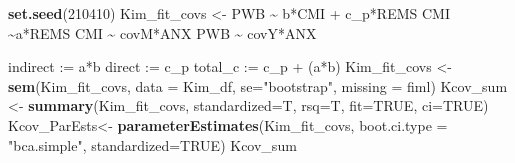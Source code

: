 \documentclass[
  11pt,
]{book}
\newenvironment{Shaded}{\begin{snugshade}}{\end{snugshade}}
\newcommand{\AttributeTok}[1]{\textcolor[rgb]{0.27,0.27,0.27}{#1}}
\newcommand{\ConstantTok}[1]{\textcolor[rgb]{0.37,0.37,0.37}{#1}}
\newcommand{\DecValTok}[1]{\textcolor[rgb]{0.06,0.06,0.06}{#1}}
\newcommand{\FunctionTok}[1]{\textcolor[rgb]{0.27,0.27,0.27}{\textbf{#1}}}
\newcommand{\NormalTok}[1]{#1}
\newcommand{\OtherTok}[1]{\textcolor[rgb]{0.37,0.37,0.37}{#1}}
\newcommand{\StringTok}[1]{\textcolor[rgb]{0.5,0.5,0.5}{#1}}
\begin{document}
\begin{Shaded}
\begin{Highlighting}[]
\FunctionTok{set.seed}\NormalTok{(}\DecValTok{210410}\NormalTok{)}
\NormalTok{Kim\_fit\_covs }\OtherTok{\textless{}{-}} \StringTok{\textquotesingle{}}
\StringTok{          PWB \textasciitilde{} b*CMI + c\_p*REMS }
\StringTok{          CMI \textasciitilde{}a*REMS}
\StringTok{          CMI \textasciitilde{} covM*ANX}
\StringTok{          PWB \textasciitilde{} covY*ANX}

\StringTok{          indirect :=  a*b}
\StringTok{          direct  := c\_p}
\StringTok{          total\_c  := c\_p + (a*b)}
\StringTok{          \textquotesingle{}}
\NormalTok{Kim\_fit\_covs }\OtherTok{\textless{}{-}} \FunctionTok{sem}\NormalTok{(Kim\_fit\_covs, }\AttributeTok{data =}\NormalTok{ Kim\_df, }\AttributeTok{se=}\StringTok{"bootstrap"}\NormalTok{, }\AttributeTok{missing =} \StringTok{\textquotesingle{}fiml\textquotesingle{}}\NormalTok{)}
\NormalTok{Kcov\_sum }\OtherTok{\textless{}{-}} \FunctionTok{summary}\NormalTok{(Kim\_fit\_covs, }\AttributeTok{standardized=}\NormalTok{T, }\AttributeTok{rsq=}\NormalTok{T, }\AttributeTok{fit=}\ConstantTok{TRUE}\NormalTok{, }\AttributeTok{ci=}\ConstantTok{TRUE}\NormalTok{)}
\NormalTok{Kcov\_ParEsts}\OtherTok{\textless{}{-}} \FunctionTok{parameterEstimates}\NormalTok{(Kim\_fit\_covs, }\AttributeTok{boot.ci.type =} \StringTok{"bca.simple"}\NormalTok{, }\AttributeTok{standardized=}\ConstantTok{TRUE}\NormalTok{)}
\NormalTok{Kcov\_sum}
\end{Highlighting}
\end{Shaded}
\end{document}
